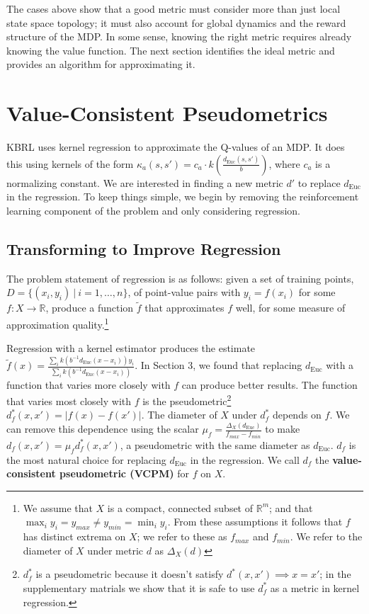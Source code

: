\documentclass{article} %
\begin{document}
The cases above show that a good metric must consider more than just local
state space topology;
it must also account for global dynamics and the reward structure of the MDP.
In some sense, knowing the right metric requires already knowing the value function.
The next section identifies the ideal metric and provides an algorithm for approximating it.

\section{Value-Consistent Pseudometrics}
KBRL uses kernel regression to approximate the Q-values of an MDP.
It does this using kernels of the form
$\kappa_a(s,s')=c_a\cdot k(\frac{d_{\mathrm{Euc}}(s,s')}{b})$, where $c_a$ is a
normalizing constant.
We are interested in finding a new metric $d'$ to replace $d_{\mathrm{Euc}}$ in
the regression.
To keep things simple, we begin by removing the reinforcement learning component
of the problem and only considering regression.

\subsection{Transforming to Improve Regression}
The problem statement of regression is as follows: given a set of training
points, $D = \{(x_i,y_i)\ |\ i = 1, \ldots, n\}$, of point-value pairs with
$y_i = f(x_i)$ for some $f : X \to \mathbb{R}$,
produce a function $\tilde f$ that approximates $f$ well, for some measure of
approximation quality.\footnote{We assume that $X$ is a compact, connected subset
of $\mathbb{R}^m$; 
and that $\max_i y_i = y_{max} \neq y_{min} = \min_i y_i$.
From these assumptions it follows that $f$ has
distinct extrema on $X$; we refer to these as $f_{max}$ and $f_{min}$.
We refer to the diameter of $X$ under metric $d$ as $\Delta_X(d)$}

Regression with a kernel estimator \cite{kern} produces the estimate
$\tilde f(x) =
\frac{\sum_i k(b^{-1}d_{\mathrm{Euc}}(x-x_i))y_i}{\sum_i k(b^{-1}d_{\mathrm{Euc}}(x-x_i))}$.
In Section 3, we found that replacing $d_{\mathrm{Euc}}$
with a function that varies more closely with $f$ can produce better results.
The function that varies most closely with $f$ is the pseudometric\footnote{$d^*_f$
is a pseudometric because it doesn't satisfy $d^*(x,x') \implies x=x'$; in the
supplementary matrials we show that it is safe to use $d^*_f$ as a metric in kernel
regression.} $d^*_f(x,x') = |f(x)-f(x')|$.
The diameter of $X$ under $d^*_f$ depends on $f$.
We can remove this dependence using the scalar
$\mu_f = \frac{\Delta_X(d_{\mathrm{Euc}})}{f_{max}-f_{min}}$ to make $d_f(x,x') = \mu_f d^*_f(x,x')$,
a pseudometric with the same diameter as $d_{\mathrm{Euc}}$.
$d_f$ is the most natural choice for replacing $d_{\mathrm{Euc}}$ in the regression.
We call $d_f$ the \textbf{value-consistent pseudometric (VCPM)} for $f$ on $X$.
\end{document}
